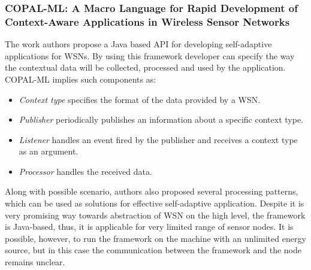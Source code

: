 \subsubsection*{COPAL-ML: A Macro Language for Rapid Development of Context-Aware
Applications in Wireless Sensor Networks}

The work authors propose a Java based API for developing self-adaptive
applications for WSNs. By using this framework developer can specify the way the
contextual data will be collected, processed and used by the application.
COPAL-ML implies such components as:
\begin{itemize}
\item \emph{Context type} specifies the format of the data provided by a WSN.
\item \emph{Publisher} periodically publishes an information about a specific
context type.
\item \emph{Listener} handles an event fired by the publisher and receives a
context type as an argument.
\item \emph{Processor} handles the received data.
\end{itemize}

Along with possible scenario, authors also proposed several processing patterns,
which can be used as solutions for effective self-adaptive application. Despite it
is very promising way towards abstraction of WSN on the high level, the
framework is Java-based, thus, it is applicable for very limited range of sensor
nodes. It is possible, however, to run the framework on the machine with an
unlimited energy source, but in this case the communication between the
framework and the node remains unclear.

